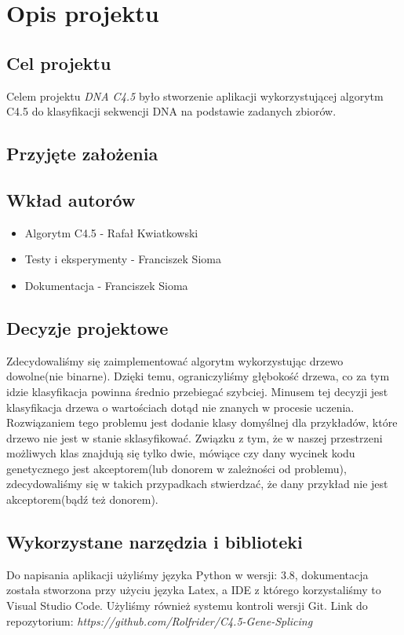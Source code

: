 \section{Opis projektu}
\subsection{Cel projektu}


Celem projektu {\it DNA C4.5} było stworzenie aplikacji wykorzystującej algorytm C4.5 do klasyfikacji sekwencji DNA na podstawie zadanych zbiorów. 

\subsection{Przyjęte założenia}

\subsection{Wkład autorów}
\begin{itemize}
    \item Algorytm C4.5 - Rafał Kwiatkowski
    \item Testy i eksperymenty - Franciszek Sioma
    \item Dokumentacja - Franciszek Sioma
\end{itemize}
\subsection{Decyzje projektowe}


Zdecydowaliśmy się zaimplementować algorytm wykorzystując drzewo dowolne(nie binarne). Dzięki temu, ograniczyliśmy głębokość drzewa, co za tym idzie klasyfikacja powinna średnio przebiegać szybciej.
Minusem tej decyzji jest klasyfikacja drzewa o wartościach dotąd nie znanych w procesie uczenia. Rozwiązaniem tego problemu jest dodanie klasy domyślnej dla przykładów, które drzewo nie jest w stanie sklasyfikować. Związku z tym, że w naszej przestrzeni możliwych klas znajdują się tylko dwie, mówiące czy dany wycinek kodu genetycznego jest akceptorem(lub donorem w zależności od problemu), zdecydowaliśmy się w takich przypadkach stwierdzać, że dany przykład nie jest akceptorem(bądź też donorem). 

\subsection{Wykorzystane narzędzia i biblioteki}


Do napisania aplikacji użyliśmy języka Python w wersji: 3.8, dokumentacja została stworzona przy użyciu języka Latex, a IDE z którego korzystaliśmy to Visual Studio Code. Użyliśmy również systemu kontroli wersji Git.
Link do repozytorium: {\it https://github.com/Rolfrider/C4.5-Gene-Splicing}
